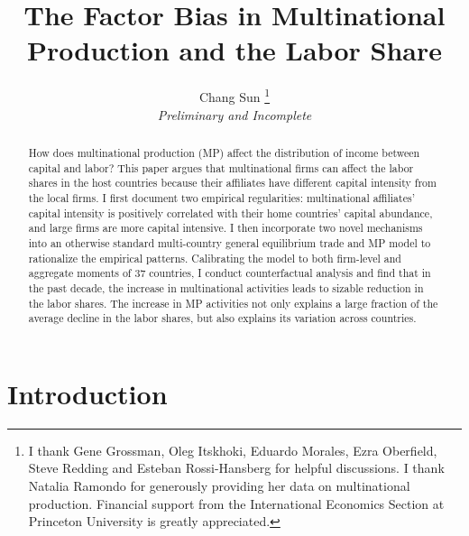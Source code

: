 \documentclass[notitlepage,11pt]{article}%
\begin{document}
\title{The Factor Bias in Multinational Production and the Labor Share}
\author{Chang Sun%
\thanks
{I thank Gene Grossman, Oleg Itskhoki, Eduardo Morales, Ezra Oberfield, Steve Redding and Esteban Rossi-Hansberg for helpful discussions.
I thank Natalia Ramondo for generously providing her data on multinational production.
Financial support from the International Economics Section at Princeton University
is greatly appreciated.}%
\\\emph{Preliminary and Incomplete}}
\maketitle

\begin{abstract}
How does multinational production (MP) affect the distribution of income
between capital and labor? This paper argues that multinational firms can
affect the labor shares in the host countries because their affiliates have
different capital intensity from the local firms. I first document two
empirical regularities: multinational affiliates' capital intensity is
positively correlated with their home countries' capital abundance, and large
firms are more capital intensive. I then incorporate two novel mechanisms into
an otherwise standard multi-country general equilibrium trade and MP model to
rationalize the empirical patterns. Calibrating the model to both firm-level
and aggregate moments of 37 countries, I conduct counterfactual analysis and
find that in the past decade, the increase in multinational activities leads
to sizable reduction in the labor shares. The increase in MP activities not
only explains a large fraction of the average decline in the labor shares, but
also explains its variation across countries.

\end{abstract}

\section{Introduction}
\end{document}
